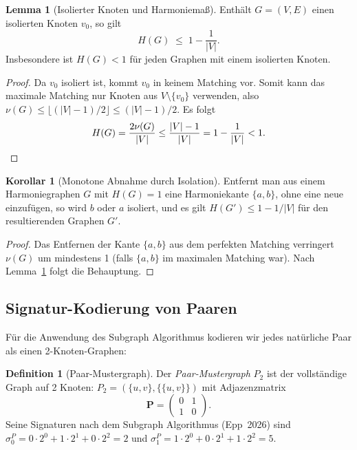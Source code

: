 ﻿\documentclass[a4paper,12pt]{article}
\theoremstyle{definition}
\newtheorem{definition}{Definition}
\newtheorem{lemma}{Lemma}
\newtheorem{korollar}{Korollar}
\begin{document}
\begin{lemma}[Isolierter Knoten und Harmoniemaß]
	\label{lem:isoliert}
	Enthält $G = (V, E)$ einen isolierten Knoten $v_0$, so gilt
	\[
		H(G) \;\leq\; 1 - \frac{1}{|V|}.
	\]
	Insbesondere ist $H(G) < 1$ für jeden Graphen mit einem isolierten Knoten.
\end{lemma}

\begin{proof}
	Da $v_0$ isoliert ist, kommt $v_0$ in keinem Matching vor.
	Somit kann das maximale Matching nur Knoten aus $V \setminus \{v_0\}$ verwenden,
	also $\nu(G) \leq \lfloor (|V|-1)/2 \rfloor \leq (|V|-1)/2$.
	Es folgt
	\[
		H(G) = \frac{2\nu(G)}{|V|} \leq \frac{|V|-1}{|V|} = 1 - \frac{1}{|V|} < 1.\qedhere
	\]
\end{proof}

\begin{korollar}[Monotone Abnahme durch Isolation]
	Entfernt man aus einem Harmoniegraphen $G$ mit $H(G) = 1$ eine Harmoniekante
	$\{a, b\}$, ohne eine neue einzufügen, so wird $b$ oder $a$ isoliert, und es gilt
	$H(G') \leq 1 - 1/|V|$ für den resultierenden Graphen $G'$.
\end{korollar}

\begin{proof}
	Das Entfernen der Kante $\{a,b\}$ aus dem perfekten Matching verringert $\nu(G)$
	um mindestens 1 (falls $\{a,b\}$ im maximalen Matching war). Nach Lemma~\ref{lem:isoliert}
	folgt die Behauptung.
\end{proof}

\subsection{Signatur-Kodierung von Paaren}

Für die Anwendung des Subgraph Algorithmus kodieren wir jedes natürliche Paar
als einen 2-Knoten-Graphen:

\begin{definition}[Paar-Mustergraph]
	Der \emph{Paar-Mustergraph} $P_2$ ist der vollständige Graph auf 2 Knoten:
	$P_2 = (\{u, v\}, \{\{u,v\}\})$ mit Adjazenzmatrix
	\[
		\mathbf{P} = \begin{pmatrix} 0 & 1 \\ 1 & 0 \end{pmatrix}.
	\]
	Seine Signaturen nach dem Subgraph Algorithmus (Epp~2026) sind
	$\sigma_0^P = 0\cdot2^0 + 1\cdot2^1 + 0\cdot2^2 = 2$ und
	$\sigma_1^P = 1\cdot2^0 + 0\cdot2^1 + 1\cdot2^2 = 5$.
\end{definition}
\end{document}
